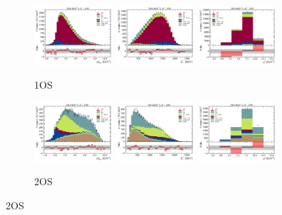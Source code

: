 \begin{figure}[htb]
    \centering
    \begin{subfigure}{\textwidth}
        \includegraphics[width=0.32\textwidth]{./figs-supplemental-plots/init-fit/pre-ctrl/fit_result-stacked-Dst-1os-mmiss2.pdf}
        \includegraphics[width=0.32\textwidth]{./figs-supplemental-plots/init-fit/pre-ctrl/fit_result-stacked-Dst-1os-el.pdf}
        \includegraphics[width=0.32\textwidth]{./figs-supplemental-plots/init-fit/pre-ctrl/fit_result-stacked-Dst-1os-q2.pdf}
        \caption{1OS}
    \end{subfigure}

    \begin{subfigure}{\textwidth}
        \includegraphics[width=0.32\textwidth]{./figs-supplemental-plots/init-fit/pre-ctrl/fit_result-stacked-Dst-2os-mmiss2.pdf}
        \includegraphics[width=0.32\textwidth]{./figs-supplemental-plots/init-fit/pre-ctrl/fit_result-stacked-Dst-2os-el.pdf}
        \includegraphics[width=0.32\textwidth]{./figs-supplemental-plots/init-fit/pre-ctrl/fit_result-stacked-Dst-2os-q2.pdf}
        \caption{2OS}
    \end{subfigure}


\end{figure}
